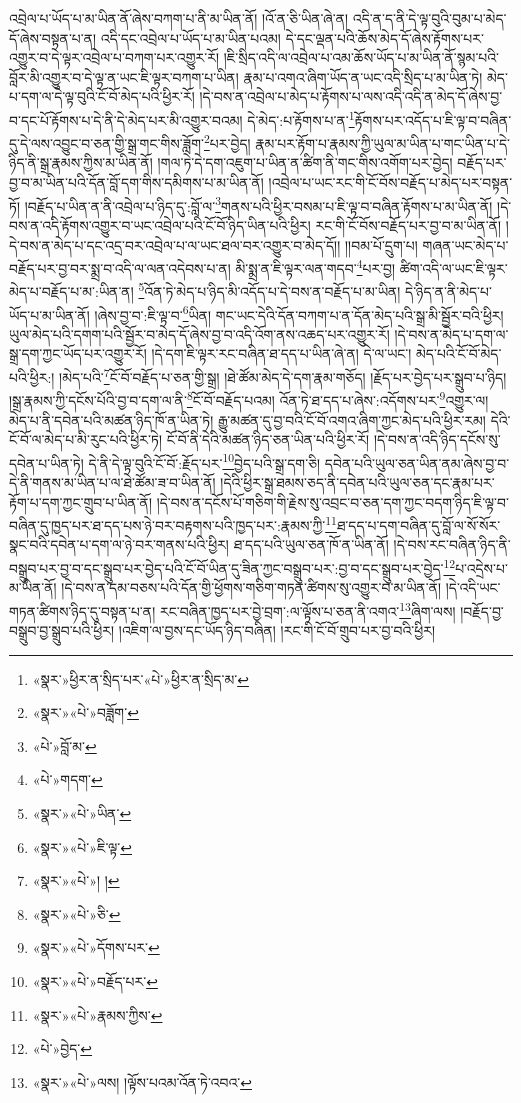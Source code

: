 འབྲེལ་པ་ཡོད་པ་མ་ཡིན་ནོ་ཞེས་བཀག་པ་ནི་མ་ཡིན་ནོ། །འོ་ན་ཅི་ཡིན་ཞེ་ན། འདི་ན་ད་ནི་དེ་ལྟ་བུའི་བུམ་པ་མེད་དོ་ཞེས་བསྟན་པ་ན། འདི་དང་འབྲེལ་པ་ཡོད་པ་མ་ཡིན་པའམ། དེ་དང་ལྡན་པའི་ཆོས་མེད་དོ་ཞེས་རྟོགས་པར་འགྱུར་བ་དེ་ལྟར་འབྲེལ་པ་བཀག་པར་འགྱུར་རོ། །ཇི་སྲིད་འདི་ལ་འབྲེལ་པ་འམ་ཆོས་ཡོད་པ་མ་ཡིན་ནོ་སྙམ་པའི་བློར་མི་འགྱུར་བ་དེ་ལྟ་ན་ཡང་ཇི་ལྟར་བཀག་པ་ཡིན། རྣམ་པ་འགའ་ཞིག་ཡོད་ན་ཡང་འདི་སྲིད་པ་མ་ཡིན་ཏེ། མེད་པ་དག་ལ་དེ་ལྟ་བུའི་ངོ་བོ་མེད་པའི་ཕྱིར་རོ། །དེ་བས་ན་འབྲེལ་པ་མེད་པ་རྟོགས་པ་ལས་འདི་འདི་ན་མེད་དོ་ཞེས་བྱ་བ་དང་པོ་རྟོགས་པ་དེ་ནི་དེ་མེད་པར་མི་འགྱུར་བའམ། དེ་མེད་:པ་རྟོགས་པ་ན་\footnote{«སྣར་»ཕྱིར་ན་སྲིད་པར་«པེ་»ཕྱིར་ན་སྲིད་མ་}རྟོགས་པར་འདོད་པ་ཇི་ལྟ་བ་བཞིན་དུ་དེ་ལས་འབྱུང་བ་ཅན་གྱི་སྒྲ་གང་གིས་ཟློག་\footnote{«སྣར་»«པེ་»བཟློག་}པར་བྱེད། རྣམ་པར་རྟོག་པ་རྣམས་ཀྱི་ཡུལ་མ་ཡིན་པ་གང་ཡིན་པ་དེ་ཉིད་ནི་སྒྲ་རྣམས་ཀྱིས་མ་ཡིན་ནོ། །གལ་ཏེ་དེ་དག་འཇུག་པ་ཡིན་ན་ཚིག་ནི་གང་གིས་འགོག་པར་བྱེད། བརྗོད་པར་བྱ་བ་མ་ཡིན་པའི་དོན་བློ་དག་གིས་དམིགས་པ་མ་ཡིན་ནོ། །འབྲེལ་པ་ཡང་རང་གི་ངོ་བོས་བརྗོད་པ་མེད་པར་བསྟན་ཏོ། །བརྗོད་པ་ཡིན་ན་ནི་འབྲེལ་པ་ཉིད་དུ་:བློ་ལ་\footnote{«པེ་»བློ་མ་}གནས་པའི་ཕྱིར་བསམ་པ་ཇི་ལྟ་བ་བཞིན་རྟོགས་པ་མ་ཡིན་ནོ། །དེ་བས་ན་འདི་རྟོགས་འགྱུར་བ་ཡང་འབྲེལ་པའི་ངོ་བོ་ཉིད་ཡིན་པའི་ཕྱིར། རང་གི་ངོ་བོས་བརྗོད་པར་བྱ་བ་མ་ཡིན་ནོ། །དེ་བས་ན་མེད་པ་དང་འདྲ་བར་འབྲེལ་པ་ལ་ཡང་ཐལ་བར་འགྱུར་བ་མེད་དོ།། །།བམ་པོ་དྲུག་པ། གཞན་ཡང་མེད་པ་བརྗོད་པར་བྱ་བར་སྨྲ་བ་འདི་ལ་ལན་འདེབས་པ་ན། མི་སྨྲ་ན་ཇི་ལྟར་ལན་གདབ་\footnote{«པེ་»གདག་}པར་བྱ། ཚིག་འདི་ལ་ཡང་ཇི་ལྟར་མེད་པ་བརྗོད་པ་མ་:ཡིན་ན། \footnote{«སྣར་»«པེ་»ཡིན་}འོན་ཏེ་མེད་པ་ཉིད་མི་འདོད་པ་དེ་བས་ན་བརྗོད་པ་མ་ཡིན། དེ་ཉིད་ན་ནི་མེད་པ་ཡོད་པ་མ་ཡིན་ནོ། །ཞེས་བྱ་བ་:ཇི་ལྟ་བ་\footnote{«སྣར་»«པེ་»ཇི་ལྟ་}ཡིན། གང་ཡང་དེའི་དོན་བཀག་པ་ན་དོན་མེད་པའི་སྒྲ་མི་སྦྱོར་བའི་ཕྱིར། ཡུལ་མེད་པའི་དགག་པའི་སྦྱོར་བ་མེད་དོ་ཞེས་བྱ་བ་འདི་འོག་ནས་འཆད་པར་འགྱུར་རོ། །དེ་བས་ན་མེད་པ་དག་ལ་སྒྲ་དག་ཀྱང་ཡོད་པར་འགྱུར་རོ། །དེ་དག་ཇི་ལྟར་རང་བཞིན་ཐ་དད་པ་ཡིན་ཞེ་ན། དེ་ལ་ཡང་། མེད་པའི་ངོ་བོ་མེད་པའི་ཕྱིར:། །མེད་པའི་\footnote{«སྣར་»«པེ་»། །}ངོ་བོ་བརྗོད་པ་ཅན་གྱི་སྒྲ། །ཐེ་ཚོམ་མེད་དེ་དག་རྣམ་གཅོད། །རྗོད་པར་བྱེད་པར་སྒྲུབ་པ་ཉིད། །སྒྲ་རྣམས་ཀྱི་དངོས་པོའི་བྱ་བ་དག་ལ་ནི་\footnote{«སྣར་»«པེ་»ཅི་}ངོ་བོ་བརྗོད་པའམ། འོན་ཏེ་ཐ་དད་པ་ཞེས་:འདོགས་པར་\footnote{«སྣར་»«པེ་»དོགས་པར་}འགྱུར་ལ། མེད་པ་ནི་དབེན་པའི་མཚན་ཉིད་ཁོ་ན་ཡིན་ཏེ། རྒྱུ་མཚན་དུ་བྱ་བའི་ངོ་བོ་འགའ་ཞིག་ཀྱང་མེད་པའི་ཕྱིར་རམ། དེའི་ངོ་བོ་ལ་མེད་པ་མི་རུང་པའི་ཕྱིར་ཏེ། ངོ་བོ་ནི་དེའི་མཚན་ཉིད་ཅན་ཡིན་པའི་ཕྱིར་རོ། །དེ་བས་ན་འདི་ཉིད་དངོས་སུ་དབེན་པ་ཡིན་ཏེ། དེ་ནི་དེ་ལྟ་བུའི་ངོ་བོ་:རྗོད་པར་\footnote{«སྣར་»«པེ་»བརྗོད་པར་}བྱེད་པའི་སྒྲ་དག་ཅི། དབེན་པའི་ཡུལ་ཅན་ཡིན་ནམ་ཞེས་བྱ་བ་དེ་ནི་གནས་མ་ཡིན་པ་ལ་ཐེ་ཚོམ་ཟ་བ་ཡིན་ནོ། །དེའི་ཕྱིར་སྒྲ་ཐམས་ཅད་ནི་དབེན་པའི་ཡུལ་ཅན་དང་རྣམ་པར་རྟོག་པ་དག་ཀྱང་གྲུབ་པ་ཡིན་ནོ། །དེ་བས་ན་དངོས་པོ་གཅིག་གི་རྗེས་སུ་འབྲང་བ་ཅན་དག་ཀྱང་བདག་ཉིད་ཇི་ལྟ་བ་བཞིན་དུ་ཁྱད་པར་ཐ་དད་པས་ཉེ་བར་བརྟགས་པའི་ཁྱད་པར་:རྣམས་ཀྱི་\footnote{«སྣར་»«པེ་»རྣམས་ཀྱིས་}ཐ་དད་པ་དག་བཞིན་དུ་བློ་ལ་སོ་སོར་སྣང་བའི་དབེན་པ་དག་ལ་ཉེ་བར་གནས་པའི་ཕྱིར། ཐ་དད་པའི་ཡུལ་ཅན་ཁོ་ན་ཡིན་ནོ། །དེ་བས་རང་བཞིན་ཉིད་ནི་བསྒྲུབ་པར་བྱ་བ་དང་སྒྲུབ་པར་བྱེད་པའི་ངོ་བོ་ཡིན་དུ་ཟིན་ཀྱང་བསྒྲུབ་པར་:བྱ་བ་དང་སྒྲུབ་པར་བྱེད་\footnote{«པེ་»བྱེད་}པ་འདྲེས་པ་མ་ཡིན་ནོ། །དེ་བས་ན་དམ་བཅས་པའི་དོན་གྱི་ཕྱོགས་གཅིག་གཏན་ཚིགས་སུ་འགྱུར་བ་མ་ཡིན་ནོ། །དེ་འདི་ཡང་གཏན་ཚིགས་ཉིད་དུ་བསྟན་པ་ན། རང་བཞིན་ཁྱད་པར་བྱེ་བྲག་:ལ་ལྟོས་པ་ཅན་ནི་འགའ་\footnote{«སྣར་»«པེ་»ལས། །ལྟོས་པའམ་འོན་ཏེ་འབའ་}ཞིག་ལས། །བརྗོད་བྱ་བསྒྲུབ་བྱ་སྒྲུབ་པའི་ཕྱིར། །འཇིག་ལ་བྱས་དང་ཡོད་ཉིད་བཞིན། །རང་གི་ངོ་བོ་གྲུབ་པར་བྱ་བའི་ཕྱིར། 